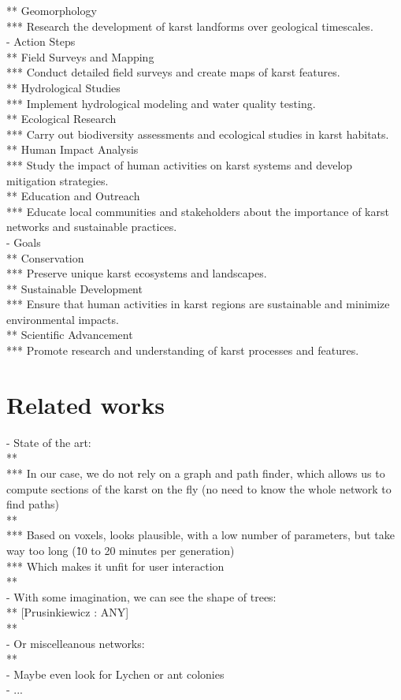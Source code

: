 ** Geomorphology \\
*** Research the development of karst landforms over geological timescales. \\
- Action Steps \\
** Field Surveys and Mapping \\
*** Conduct detailed field surveys and create maps of karst features. \\
** Hydrological Studies \\
*** Implement hydrological modeling and water quality testing. \\
** Ecological Research \\
*** Carry out biodiversity assessments and ecological studies in karst habitats. \\
** Human Impact Analysis \\
*** Study the impact of human activities on karst systems and develop mitigation strategies. \\
** Education and Outreach \\
*** Educate local communities and stakeholders about the importance of karst networks and sustainable practices. \\
- Goals \\
** Conservation \\
*** Preserve unique karst ecosystems and landscapes. \\
** Sustainable Development \\
*** Ensure that human activities in karst regions are sustainable and minimize environmental impacts. \\
** Scientific Advancement \\
*** Promote research and understanding of karst processes and features.

\section{Related works}
\label{sec:karsts_related-works}
- State of the art: \\
** \cite{Paris2021} \\
*** In our case, we do not rely on a graph and path finder, which allows us to compute sections of the karst on the fly (no need to know the whole network to find paths) \\
** \cite{Pytel2015} \\
*** Based on voxels, looks plausible, with a low number of parameters, but take way too long (\~10 to 20 minutes per generation) \\
*** Which makes it unfit for user interaction \\
** \cite{Collon2015,Collon2017} \\
- With some imagination, we can see the shape of trees: \\
** [Prusinkiewicz : ANY] \\
** \cite{Runions2008} \\
- Or miscelleanous networks: \\
** \cite{Galin2010, DiasFernandes2018} \\
- Maybe even look for Lychen or ant colonies \\
- ...

